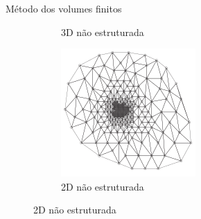 \documentclass[professionalfont]{beamer}
\begin{document}
\begin{frame}{Método dos volumes finitos}
\begin{figure}[!ht]
\begin{subfigure}{.45\textwidth}
        \caption{3D não estruturada}
        \label{fig:volumes_finitos1.c}
    \end{subfigure}
    \begin{subfigure}{.45\textwidth}
        \centering
        \includegraphics[scale=0.27]{./imgs/im5.png}
        \caption{2D não estruturada}
        \label{fig:volumes_finitos1.d}
    \end{subfigure}
\end{figure}

\end{frame}
\end{document}

